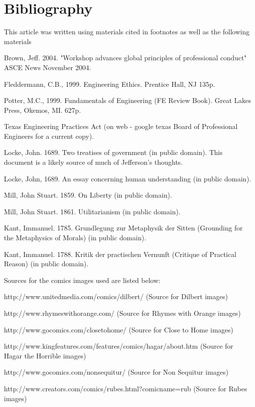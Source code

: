 \section*{Bibliography}
This article was written using materials cited in footnotes as well as the following materials

Brown, Jeff. 2004. "Workshop advances global principles of professional conduct" ASCE News November 2004.

Fleddermann, C.B., 1999. Engineering Ethics. Prentice Hall, NJ 135p.

Potter, M.C., 1999. Fundamentals of Engineering (FE Review Book). Great Lakes Press, Okemos, MI. 627p.

Texas Engineering Practices Act (on web - google texas Board of Professional Engineers  for a current copy).

Locke, John. 1689. Two treatises of government   (in public domain).  This document is a likely source of much of Jefferson's thoughts.

Locke, John, 1689. An essay concerning human understanding   (in public domain).

Mill, John Stuart. 1859.  On Liberty (in public domain).

Mill, John Stuart. 1861. Utilitarianism (in public domain).

Kant, Immanuel. 1785.  Grundlegung zur Metaphysik der Sitten (Grounding for the Metaphysics of Morals) (in public domain).

Kant, Immanuel. 1788.  Kritik der practischen Vernunft (Critique of Practical Reason) (in public domain).

Sources for the comics images used are listed below:

http://www.unitedmedia.com/comics/dilbert/  (Source for Dilbert images)

http://www.rhymeswithorange.com/ (Source for Rhymes with Orange images)

http://www.gocomics.com/closetohome/ (Source for Close to Home images)

http://www.kingfeatures.com/features/comics/hagar/about.htm (Source for Hagar the Horrible images)

http://www.gocomics.com/nonsequitur/ (Source for Non Sequitur images)

http://www.creators.com/comics/rubes.html?comicname=rub (Source for Rubes images)

